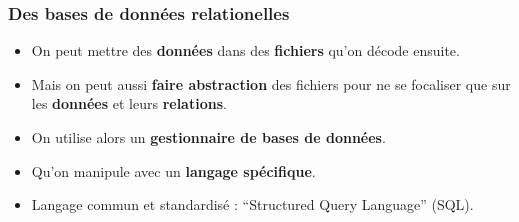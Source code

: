 \subsubsection{Des bases de données relationelles}
\begin{slide}
	\begin{itemize}
		\item On peut mettre des \textbf{données} dans des \textbf{fichiers} qu'on décode ensuite.
		\item Mais on peut aussi \textbf{faire abstraction} des fichiers pour ne se focaliser que sur les \textbf{données} et leurs \textbf{relations}.
	\end{itemize}
\end{slide}

\begin{slide}
	\begin{itemize}
		\item On utilise alors un \textbf{gestionnaire de bases de données}.
		\item Qu'on manipule avec un \textbf{langage spécifique}.
		\item Langage commun et standardisé : \enquote{Structured Query Language} (SQL).
	\end{itemize}
\end{slide}

